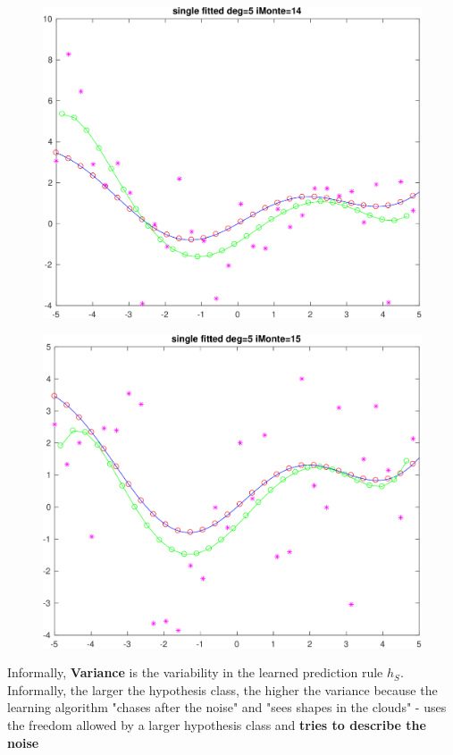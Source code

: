 \begin{figure}[h!]
\centering\includegraphics[scale=0.1]{single_poly_d_5_iMonte_14.png}
\end{figure}

\begin{figure}[h!]
\centering\includegraphics[scale=0.1]{single_poly_d_5_iMonte_15.png}
\end{figure}


\newpage


 Informally, {\bf Variance} is the variability in the learned prediction  rule $h_S$.
 Informally, the larger the hypothesis class, the higher the variance because the learning algorithm "chases after the noise" and "sees shapes in the clouds" - uses the freedom allowed by a larger hypothesis class
 and {\bf tries to describe the noise}


